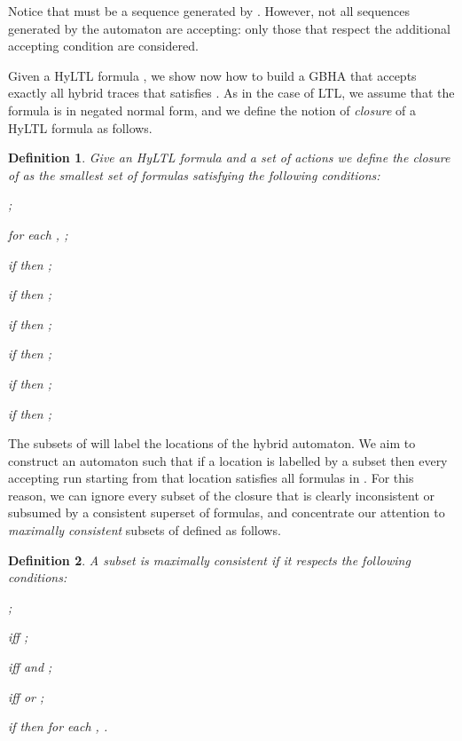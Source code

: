 \documentclass[submission,copyright,creativecommons]{eptcs}
\newcommand{\hyltl}{\textsf{HyLTL}\xspace}
\newcommand{\ltl}{\textsf{LTL}\xspace}
\newtheorem{definition}{Definition}
\begin{document}
\noindent Notice that  must be a sequence generated by . However, not all sequences generated by the automaton are accepting: only those that respect the additional accepting condition are considered.

Given a \hyltl formula , we show now how to build a GBHA that accepts exactly all hybrid traces that satisfies . As in the case of \ltl , we assume that the formula is in negated normal form, and we define the notion of \emph{closure} of a \hyltl formula as follows.

\setlength{\multicolsep}{0pt}

\begin{definition}\label{def:closure}
Give an \hyltl formula  and a set of actions  we define the \emph{closure of } as the smallest set  of formulas satisfying the following conditions:
\begin{multicols}{2}
\begin{compactitem}
	\item ;
	\item for each , ;
	\item if  then ;
	\item if  then ;
	\item if  then ;
	\item if  then ;
	\item if  then ;
	\item if  then ;
\end{compactitem}
\end{multicols}
\end{definition}

\noindent The subsets of  will label the locations of the hybrid automaton.  We aim to construct an automaton such that if a location is labelled by a subset  then every accepting run starting from that location satisfies all formulas in . For this reason, we can ignore every subset of the closure that is clearly inconsistent or subsumed by a consistent superset of formulas, and concentrate our attention to \emph{maximally consistent} subsets of  defined as follows.

\begin{definition}\label{def:maximally-consistent}
A subset  is \emph{maximally consistent} if it respects the following conditions:
\begin{multicols}{2}
\begin{compactenum}
	\item ;
	\item  iff ;
	\item  iff  and ;
	\item  iff  or ;
	\item if   then for each , .
\end{compactenum}
\end{multicols}
\end{definition}
\end{document}
